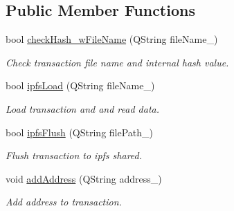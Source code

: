 \subsection*{Public Member Functions}
\begin{DoxyCompactItemize}
\item 
\mbox{\label{classeven_1_1_transaction_abd14294c8685514091435d73930ca200}} 
bool \mbox{\hyperlink{classeven_1_1_transaction_abd14294c8685514091435d73930ca200}{check\+Hash\+\_\+w\+File\+Name}} (Q\+String file\+Name\+\_\+)
\begin{DoxyCompactList}\small\item\em Check transaction file name and internal hash value. \end{DoxyCompactList}\item 
\mbox{\label{classeven_1_1_transaction_a21bbda5aa04dbbc38847061384667a7e}} 
bool \mbox{\hyperlink{classeven_1_1_transaction_a21bbda5aa04dbbc38847061384667a7e}{ipfs\+Load}} (Q\+String file\+Name\+\_\+)
\begin{DoxyCompactList}\small\item\em Load transaction and and read data. \end{DoxyCompactList}\item 
\mbox{\label{classeven_1_1_transaction_a30d1d15267672db15ff5c6df783039c5}} 
bool \mbox{\hyperlink{classeven_1_1_transaction_a30d1d15267672db15ff5c6df783039c5}{ipfs\+Flush}} (Q\+String file\+Path\+\_\+)
\begin{DoxyCompactList}\small\item\em Flush transaction to ipfs shared. \end{DoxyCompactList}\item 
\mbox{\label{classeven_1_1_transaction_a36b81dd08f2d791845d0d099bbafaf3f}} 
void \mbox{\hyperlink{classeven_1_1_transaction_a36b81dd08f2d791845d0d099bbafaf3f}{add\+Address}} (Q\+String address\+\_\+)
\begin{DoxyCompactList}\small\item\em Add address to transaction. \end{DoxyCompactList}\item 
\mbox{\label{classeven_1_1_transaction_a50b19d32d3f4348598175df6ecbef771}} 

\end{DoxyCompactItemize}

